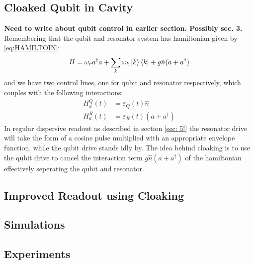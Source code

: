 \subsection{Cloaked Qubit in Cavity}
\textbf{Need to write about qubit control in earlier section. Possibly sec. 3. } \\
Remembering that the qubit and resonator system has hamiltonian given by \ref{eq:HAMILTOIN}:
\begin{equation}
    H = \omega_r a^\dagger a + \sum_k \omega_k \ket{k}\bra{k} + g \hat{n}(a + a^\dagger)
\end{equation}
and we have two control lines, one for qubit and resonator respectively, which couples with the following interactions:
\begin{align}
    H_d^Q(t) &= \varepsilon_Q(t) \hat{n} \\ 
    H_d^R(t) &= \varepsilon_R(t) (a + a^\dagger) 
\end{align}
In regular dispersive readout as described in section \ref{sec: 5!} the resonator drive will take the form of a cosine pulse multiplied with an appropriate envelope function, while the qubit drive stands idly by. The idea behind cloaking is to use the qubit drive to cancel the interaction term $g\hat{n}(a + a^\dagger )$ of the hamiltonian effectively seperating the qubit and resonator. 


\subsection{Improved Readout using Cloaking}


\subsection{Simulations}

\subsection{Experiments}
